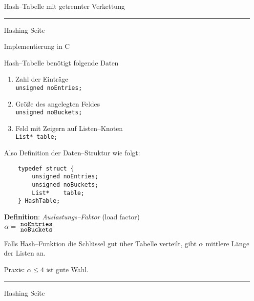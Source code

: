 
\begin{slide}{}
\normalsize

\begin{center}
Hash--Tabelle mit getrennter Verkettung
\end{center}
\vspace*{0.5cm}

\footnotesize
{}


\vspace*{\fill}
\tiny \addtocounter{mypage}{1}
\rule{17cm}{1mm}
Hashing  \hspace*{\fill} Seite 
\end{slide}


\begin{slide}{}
\normalsize

\begin{center}
Implementierung in C
\end{center}
\vspace*{0.5cm}

\footnotesize
Hash--Tabelle ben\"otigt folgende Daten
\begin{enumerate}
\item Zahl der Eintr\"age \\[0.3cm]
      \hspace*{1.3cm} \texttt{unsigned noEntries;}
\item Gr\"o{\ss}e des angelegten Feldes \\[0.3cm]
      \hspace*{1.3cm} \texttt{unsigned noBuckets;}
\item Feld mit Zeigern auf Listen--Knoten \\[0.3cm]
      \hspace*{1.3cm} \texttt{List* table;}
\end{enumerate}
Also Definition der Daten--Struktur wie folgt:
\begin{verbatim}
    typedef struct {
        unsigned noEntries; 
        unsigned noBuckets; 
        List*    table;     
    } HashTable;
\end{verbatim}
\vspace*{0.3cm}

\textbf{Definition}: \emph{Auslastungs--Faktor} (load factor) \\[0.3cm]
\hspace*{1.3cm} $\alpha = \frac{\displaystyle\;\mathtt{noEntries}\;}{\displaystyle\;\mathtt{noBuckets}\;}$
\vspace*{0.5cm}

Falls Hash--Funktion die Schl\"ussel gut \"uber Tabelle verteilt, gibt $\alpha$
mittlere L\"ange der Listen an.

Praxis: $\alpha \leq 4$ ist gute Wahl.

\vspace*{\fill}
\tiny \addtocounter{mypage}{1}
\rule{17cm}{1mm}
Hashing  \hspace*{\fill} Seite 
\end{slide}

